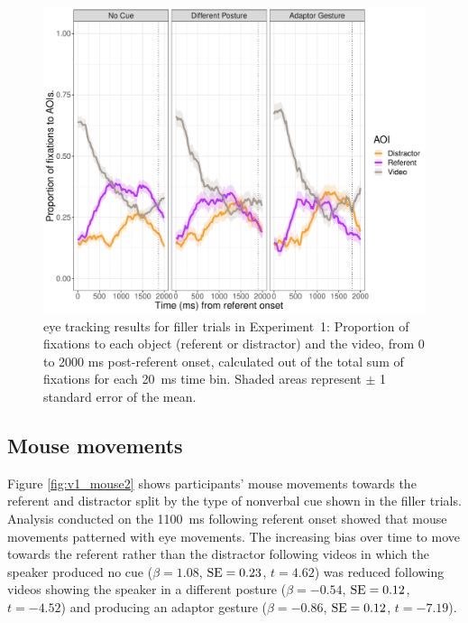 \documentclass[a4paper,man,natbib]{apa6}
\newcommand{\resultsLM}[3]{$\beta = #1$, $\textnormal{SE} = #2$, $t #3$}
\begin{document}

\begin{figure}[Ht]
  \centering
	\includegraphics[width=\linewidth]{./img/e7_fixations_filler.pdf}
  \caption{eye tracking results for filler trials in Experiment~1: Proportion of fixations to each object (referent or distractor) and the video, from 0 to 2000 ms post-referent onset, calculated out of the total sum of fixations for each 20~ms time bin. Shaded areas represent $\pm$ 1 standard error of the mean.}
  \label{fig:v1_eye2}
\end{figure}

\subsection{Mouse movements}
Figure \ref{fig:v1_mouse2} shows participants' mouse movements towards the referent and distractor split by the type of nonverbal cue shown in the filler trials. 
Analysis conducted on the 1100~ms following referent onset showed that mouse movements patterned with eye movements.
The increasing bias over time to move towards the referent rather than the distractor following videos in which the speaker produced no cue (\resultsLM{1.08}{0.23}{=4.62}) was reduced following videos showing the speaker in a different posture (\resultsLM{-0.54}{0.12}{=-4.52}) and producing an adaptor gesture (\resultsLM{-0.86}{0.12}{=-7.19}).
\end{document}
